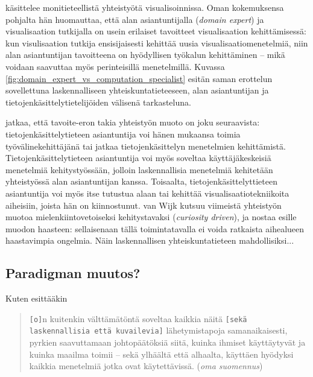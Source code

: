 \documentclass[finnish,gradu,twoside,12pt]{tktltiki}
\begin{document}
{\begin{figure}
\end{figure}

\citet{Wijk2006} käsittelee monitieteellistä yhteistyötä visualisoinnissa. Oman kokemuksensa pohjalta hän huomauttaa, että alan asiantuntijalla (\textit{domain expert}) ja visualisaation tutkijalla on usein erilaiset tavoitteet visualisaation kehittämisessä: kun visulisaation tutkija ensisijaisesti kehittää uusia visualisaatiomenetelmiä, niin alan asiantuntijan tavoitteena on hyödyllisen työkalun kehittäminen -- mikä voidaan saavuttaa myös perinteisillä menetelmillä. Kuvassa \ref{fig:domain_expert_vs_computation_specialist} esitän saman erottelun sovellettuna laskennalliseen yhteiskuntatieteeseen, alan asiantuntijan ja tietojenkäsittelytietelijöiden välisenä tarkasteluna.

\citet{Wijk2006} jatkaa, että tavoite-eron takia yhteistyön muoto on joku seuraavista: tietojenkäsittelytieteen asiantuntija voi hänen mukaansa toimia työvälinekehittäjänä tai jatkaa tietojenkäsittelyn menetelmien kehittämistä. Tietojenkäsittelytieteen asiantuntija voi myös soveltaa käyttäjäkeskeisiä menetelmiä kehitystyössään, jolloin laskennallisia menetelmiä kehitetään yhteistyössä alan asiantuntijan kanssa. Toisaalta, tietojenkäsittelyttieteen asiantuntija voi myös itse tutustua alaan tai kehittää visualisaatiotekniikoita aiheisiin, joista hän on kiinnostunut. van Wijk kutsuu viimeistä yhteistyön muotoa mielenkiintovetoiseksi kehitystavaksi (\textit{curiosity driven}), ja nostaa esille muodon haasteen: sellaisenaan tällä toimintatavalla ei voida ratkaista aihealueen haastavimpia ongelmia. Näin laskennallisen yhteiskuntatieteen mahdollisiksi... 

\subsection{Paradigman muutos?}

Kuten \citet[265]{watts11} esittääkin

\begin{quote}
\texttt{[o]}n kuitenkin välttämätöntä soveltaa kaikkia näitä \texttt{[sekä laskennallisia että kuvailevia]} lähetymistapoja samanaikaisesti, pyrkien saavuttamaan johtopäätöksiä siitä, kuinka ihmiset käyttäytyvät ja kuinka maailma toimii -- sekä ylhäältä että alhaalta, käyttäen hyödyksi kaikkia menetelmiä jotka ovat käytettävissä. (\textit{oma suomennus})
\end{quote}

}
\end{document}
